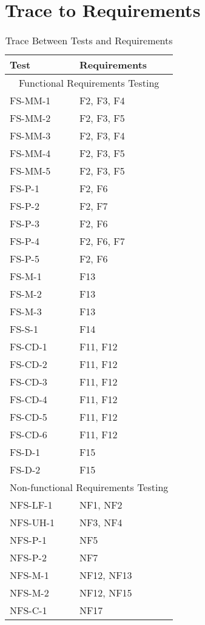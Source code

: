 \documentclass[12pt, titlepage]{article}
\begin{document}
\newpage		
\section{Trace to Requirements}

\begin{table}[!htbp]
	\begin{tabular}{ll}
		\toprule
		Test & Requirements \\
		\midrule
		\multicolumn{2}{c}{Functional Requirements Testing} \\
		\midrule
		FS-MM-1 & F2, F3, F4 \\
		FS-MM-2 & F2, F3, F5 \\
		FS-MM-3 & F2, F3, F4 \\
		FS-MM-4 & F2, F3, F5 \\
		FS-MM-5 & F2, F3, F5 \\
		FS-P-1 & F2, F6 \\
		FS-P-2 & F2, F7 \\
		FS-P-3 & F2, F6 \\
		FS-P-4 & F2, F6, F7 \\
		FS-P-5 & F2, F6 \\
		FS-M-1 & F13 \\
		FS-M-2 & F13 \\
		FS-M-3 & F13 \\
		FS-S-1 & F14\\
		FS-CD-1 & F11, F12 \\
		FS-CD-2 & F11, F12 \\
		FS-CD-3 & F11, F12 \\
		FS-CD-4 & F11, F12 \\
		FS-CD-5 & F11, F12 \\
		FS-CD-6 & F11, F12 \\
		FS-D-1 & F15 \\
		FS-D-2 & F15 \\
		\midrule
		\multicolumn{2}{c}{Non-functional Requirements Testing} \\
		\midrule
		NFS-LF-1 & NF1, NF2 \\
		NFS-UH-1 & NF3, NF4 \\
		NFS-P-1 & NF5 \\
		NFS-P-2 & NF7 \\
		NFS-M-1 & NF12, NF13 \\
		NFS-M-2 & NF12, NF15 \\
		NFS-C-1 & NF17 \\
		\bottomrule
	\end{tabular}
	\caption{Trace Between Tests and Requirements}
	\makeatletter
	\def\rulecolor#1#{\CT@arc{#1}}
	\def\CT@arc#1#2{%
		\ifdim\baselineskip=\z@\noalign\fi
		{\gdef\CT@arc@{\color#1{#2}}}}
	\let\CT@arc@\relax
	\makeatother
	\label{Table}
\end{table}
\FloatBarrier
		
\end{document}
